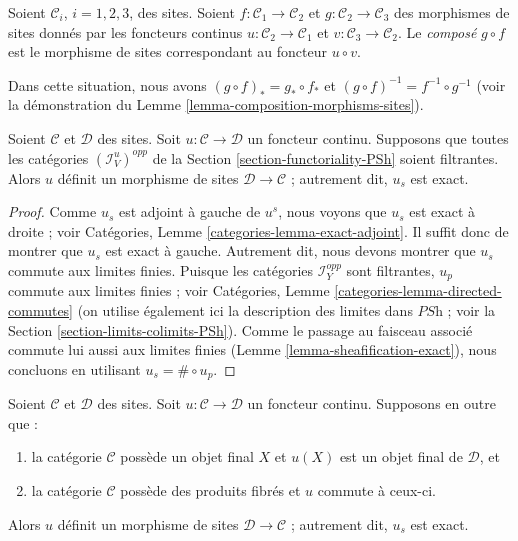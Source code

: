 \begin{definition}
\label{definition-composition-morphisms-sites}
Soient $\mathcal{C}_i$, $i = 1, 2, 3$, des sites. Soient
$f : \mathcal{C}_1 \to \mathcal{C}_2$ et
$g : \mathcal{C}_2 \to \mathcal{C}_3$ des morphismes de sites
donnés par les foncteurs continus $u : \mathcal{C}_2 \to \mathcal{C}_1$
et $v : \mathcal{C}_3 \to \mathcal{C}_2$. Le {\it composé}
$g \circ f$ est le morphisme de sites correspondant au
foncteur $u \circ v$.
\end{definition}

\noindent
Dans cette situation, nous avons $(g \circ f)_* = g_* \circ f_*$ et
$(g \circ f)^{-1} = f^{-1} \circ g^{-1}$ (voir la démonstration du
Lemme \ref{lemma-composition-morphisms-sites}).

\begin{lemma}
\label{lemma-directed-morphism}
Soient $\mathcal{C}$ et $\mathcal{D}$ des sites. Soit
$u : \mathcal{C} \to \mathcal{D}$ un foncteur continu.
Supposons que toutes les catégories $(\mathcal{I}_V^u)^{opp}$ de la
Section \ref{section-functoriality-PSh}
soient filtrantes. Alors $u$ définit un morphisme de sites $\mathcal{D} \to
\mathcal{C}$ ; autrement dit, $u_s$ est exact.
\end{lemma}

\begin{proof}
Comme $u_s$ est adjoint à gauche de $u^s$, nous voyons que $u_s$ est exact à droite ;
voir Catégories, Lemme \ref{categories-lemma-exact-adjoint}.
Il suffit donc de montrer que $u_s$ est exact à gauche. Autrement dit,
nous devons montrer que $u_s$ commute aux limites finies.
Puisque les catégories $\mathcal{I}_Y^{opp}$ sont filtrantes,
$u_p$ commute aux limites finies ; voir
Catégories, Lemme \ref{categories-lemma-directed-commutes}
(on utilise également ici la description des limites dans $\textit{PSh}$ ;
voir la Section \ref{section-limits-colimits-PSh}).
Comme le passage au faisceau associé commute lui aussi aux limites finies
(Lemme \ref{lemma-sheafification-exact}), nous concluons en utilisant
$u_s = \# \circ u_p$.
\end{proof}

\begin{proposition}
\label{proposition-get-morphism}
Soient $\mathcal{C}$ et $\mathcal{D}$ des sites. Soit
$u : \mathcal{C} \to \mathcal{D}$ un foncteur continu.
Supposons en outre que :
\begin{enumerate}
\item la catégorie $\mathcal{C}$ possède un objet final $X$ et
$u(X)$ est un objet final de $\mathcal{D}$, et
\item la catégorie $\mathcal{C}$ possède des produits fibrés et
$u$ commute à ceux-ci.
\end{enumerate}
Alors $u$ définit un morphisme de sites $\mathcal{D} \to
\mathcal{C}$ ; autrement dit, $u_s$ est exact.
\end{proposition}

